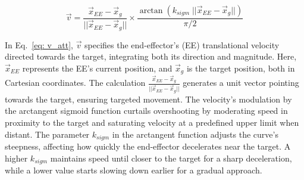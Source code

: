 \documentclass[letterpaper, 10 pt, conference]{ieeeconf}  %
\begin{document}
\begin{equation} 
	\vec{v} = \frac{\vec{x}_{EE} - \vec{x}_g}{||\vec{x}_{EE} - \vec{x}_g||} \times \frac{\arctan(k_{sigm} \; ||\vec{x}_{EE} - \vec{x}_g||) }{\pi/2}
	\label{eq: v_att}
\end{equation}

In Eq.~\ref{eq: v_att}, $\vec{v}$ specifies the end-effector's (EE) translational velocity directed towards the target, integrating both its direction and magnitude. Here, $\vec{x}_{EE}$ represents the EE's current position, and $\vec{x}_g$ is the target position, both in Cartesian coordinates. The calculation $\frac{\vec{x}_{EE}-\vec{x}_g}{||\vec{x}_{EE}-\vec{x}_g||}$ generates a unit vector pointing towards the target, ensuring targeted movement. The velocity's modulation by the arctangent sigmoid function curtails overshooting by moderating speed in proximity to the target and saturating velocity at a predefined upper limit when distant. The parameter \(k_{sigm}\) in the arctangent function adjusts the curve's steepness, affecting how quickly the end-effector decelerates near the target. A higher \(k_{sigm}\) maintains speed until closer to the target for a sharp deceleration, while a lower value starts slowing down earlier for a gradual approach. 
\end{document}
